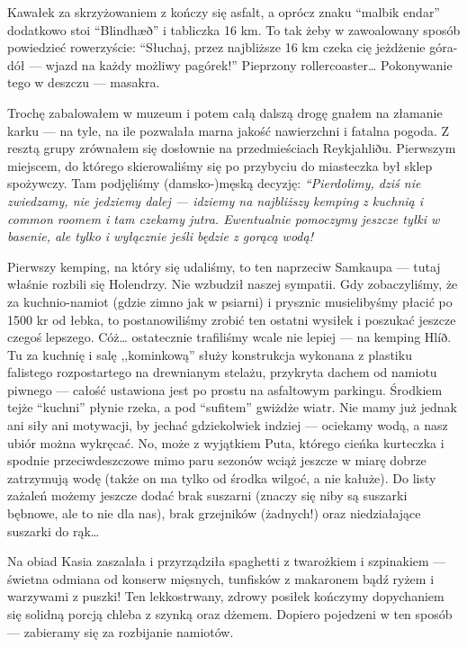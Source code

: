 Kawałek za skrzyżowaniem  z  kończy się asfalt, a oprócz znaku “malbik endar” dodatkowo stoi “Blindhæð” i tabliczka 16 km. To tak żeby w zawoalowany sposób powiedzieć rowerzyście: “Słuchaj, przez najbliższe 16 km czeka cię jeżdżenie góra-dół --- wjazd na każdy możliwy pagórek!” Pieprzony rollercoaster… Pokonywanie tego w deszczu --- masakra.


Trochę zabalowałem w muzeum i potem całą dalszą drogę gnałem na złamanie karku --- na tyle, na ile pozwalała marna jakość nawierzchni i fatalna pogoda. Z resztą grupy zrównałem się dosłownie na przedmieściach Reykjahliðu. Pierwszym miejscem, do którego skierowaliśmy się po przybyciu do miasteczka był sklep spożywczy. Tam podjęliśmy (damsko-)męską decyzję: \emph{“Pierdolimy, dziś nie zwiedzamy, nie jedziemy dalej --- idziemy na najbliższy kemping z kuchnią i common roomem i tam czekamy jutra. Ewentualnie pomoczymy jeszcze tyłki w basenie, ale tylko i wyłącznie jeśli będzie z gorącą wodą!}

Pierwszy kemping, na który się udaliśmy, to ten naprzeciw Samkaupa --- tutaj właśnie rozbili się Holendrzy. Nie wzbudził naszej sympatii. Gdy zobaczyliśmy, że za kuchnio-namiot (gdzie zimno jak w psiarni) i prysznic musielibyśmy płacić po 1500 kr od łebka, to postanowiliśmy zrobić ten ostatni wysiłek i poszukać jeszcze czegoś lepszego. Cóż… ostatecznie trafiliśmy wcale nie lepiej --- na kemping Hlíð. Tu za kuchnię i salę ,,kominkową'' służy konstrukcja wykonana z plastiku falistego rozpostartego na drewnianym stelażu, przykryta dachem od namiotu piwnego --- całość ustawiona jest po prostu na asfaltowym parkingu. Środkiem tejże “kuchni” płynie rzeka, a pod “sufitem” gwiżdże wiatr. Nie mamy już jednak ani siły ani motywacji, by jechać gdziekolwiek indziej --- ociekamy wodą, a nasz ubiór można wykręcać. No, może z wyjątkiem Puta, którego cieńka kurteczka i spodnie przeciwdeszczowe mimo paru sezonów wciąż jeszcze w miarę dobrze zatrzymują wodę (także on ma tylko od środka wilgoć, a nie kałuże). Do listy zażaleń możemy jeszcze dodać brak suszarni (znaczy się niby są suszarki bębnowe, ale to nie dla nas), brak grzejników (żadnych!) oraz niedziałające suszarki do rąk…

Na obiad Kasia zaszalała i przyrządziła spaghetti z twarożkiem i szpinakiem --- świetna odmiana od konserw mięsnych, tunfisków z makaronem bądź ryżem i warzywami z puszki! Ten lekkostrwany, zdrowy posiłek kończymy dopychaniem się solidną porcją chleba z szynką oraz dżemem. Dopiero pojedzeni w ten sposób --- zabieramy się za rozbijanie namiotów.

